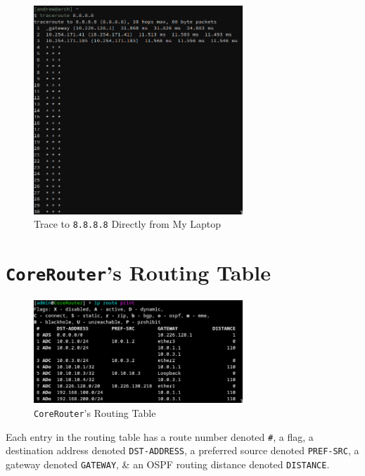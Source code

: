 \documentclass[a4paper]{article}
\begin{document}
\begin{figure}[H]
    \centering
    \includegraphics[width=0.7\textwidth]{./images/laptop_ping_internet.png}
    \caption{Trace to \texttt{8.8.8.8} Directly from My Laptop}
\end{figure}

\section{\texttt{CoreRouter}'s Routing Table}
\begin{figure}[H]
    \centering
    \includegraphics[width=0.7\textwidth]{./images/routing_table.png}
    \caption{\texttt{CoreRouter}'s Routing Table}
\end{figure}

Each entry in the routing table has a route number denoted \verb|#|, a flag, a destination address denoted \verb|DST-ADDRESS|, 
a preferred source denoted \verb|PREF-SRC|, a gateway denoted \verb|GATEWAY|, \& an OSPF routing distance denoted 
\verb|DISTANCE|.
\end{document}
